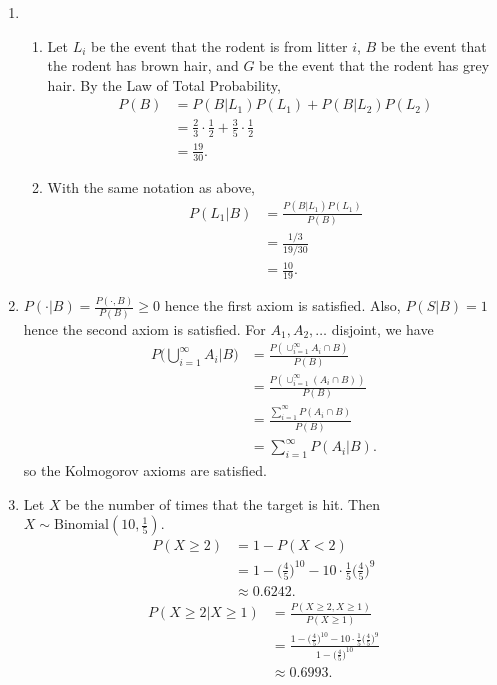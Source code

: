 \documentclass{article}
\begin{document}
\begin{enumerate}
    \item \begin{enumerate}
        \item Let $L_i$ be the event that the rodent is from litter $i$, $B$ be the event
        that the rodent has brown hair, and $G$ be the event that the rodent has grey hair.
        By the Law of Total Probability,
        \begin{align*}
            P(B)
            &= P(B|L_1)P(L_1) + P(B|L_2)P(L_2) \\
            &= \frac{2}{3} \cdot \frac{1}{2} + \frac{3}{5} \cdot \frac{1}{2} \\
            &= \frac{19}{30}.
        \end{align*}

        \item With the same notation as above,
        \begin{align*}
            P(L_1|B)
            &= \frac{P(B|L_1)P(L_1)}{P(B)} \\
            &= \frac{1/3}{19/30} \\
            &= \frac{10}{19}.
        \end{align*}
    \end{enumerate}

    \item $P(\cdot|B) = \frac{P(\cdot, B)}{P(B)} \geq 0$ hence the first axiom is satisfied. 
    Also, $P(S|B) = 1$ hence the second axiom is satisfied. For $A_1, A_2, \dots$ disjoint, 
    we have 
    \begin{align*}
        P\Big( \bigcup_{i = 1}^{\infty} A_i \Big| B \Big) 
        &= \frac{P(\cup_{i = 1}^{\infty} A_i \cap B)}{P(B)} \\
        &= \frac{P(\cup_{i = 1}^{\infty} (A_i \cap B))}{P(B)} \\
        &= \frac{\sum_{i = 1}^{\infty} P(A_i \cap B)}{P(B)} \\
        &= \sum_{i = 1}^{\infty} P(A_i | B).
    \end{align*}
    so the Kolmogorov axioms are satisfied.

    \item Let $X$ be the number of times that the target is hit. Then 
    $X \sim \text{Binomial}(10, \frac{1}{5})$.
    \begin{align*}
        P(X \geq 2)
        &= 1 - P(X < 2) \\
        &= 1 - \Big( \frac{4}{5} \Big)^{10} - 10\cdot \frac{1}{5} \Big( \frac{4}{5} \Big)^{9} \\
        &\approx 0.6242.
    \end{align*}
    \begin{align*}
        P(X \geq 2|X \geq 1) 
        &= \frac{P(X \geq 2, X \geq 1)}{P(X \geq 1)} \\
        &= \frac
        {1 - \Big( \frac{4}{5} \Big)^{10} - 10\cdot \frac{1}{5} \Big( \frac{4}{5} \Big)^{9}}
        {1 - \Big( \frac{4}{5} \Big)^{10}} \\
        &\approx 0.6993.
    \end{align*}


\end{enumerate}
\end{document}
